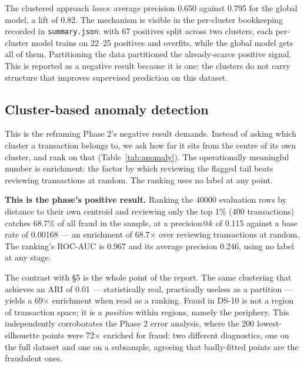 \documentclass[11pt, a4paper]{article}
\providecommand{\num}[1]{#1}
\begin{document}


The clustered approach \emph{loses}: average precision \num{0.650} against
\num{0.795} for the global model, a lift of \num{0.82}. The mechanism is visible
in the per-cluster bookkeeping recorded in \texttt{summary.json}: with \num{67}
positives split across two clusters, each per-cluster model trains on 22--25
positives and overfits, while the global model gets all of them. Partitioning the
data partitioned the already-scarce positive signal. This is reported as a
negative result because it is one; the clusters do not carry structure that
improves supervised prediction on this dataset.

\subsection{Cluster-based anomaly detection}
This is the reframing Phase 2's negative result demands. Instead of asking which
cluster a transaction belongs to, we ask how far it sits from the centre of its
own cluster, and rank on that (Table~\ref{tab:anomaly}). The operationally
meaningful number is enrichment: the factor by which reviewing the flagged tail
beats reviewing transactions at random. The ranking uses no label at any point.



\textbf{This is the phase's positive result.} Ranking the \num{40000} evaluation
rows by distance to their own centroid and reviewing only the top 1\% (\num{400}
transactions) catches \num{68.7}\% of all fraud in the sample, at a
precision@$k$ of \num{0.115} against a base rate of \num{0.00168} --- an
enrichment of \num{68.7}$\times$ over reviewing transactions at random. The
ranking's ROC-AUC is \num{0.967} and its average precision \num{0.246}, using no
label at any stage.

The contrast with §5 is the whole point of the report. The same clustering that
achieves an ARI of \num{0.01} --- statistically real, practically useless as a
partition --- yields a \num{69}$\times$ enrichment when read as a ranking. Fraud
in DS-10 is not a region of transaction space; it is a \emph{position} within
regions, namely the periphery. This independently corroborates the Phase 2 error
analysis, where the \num{200} lowest-silhouette points were \num{72}$\times$
enriched for fraud: two different diagnostics, one on the full dataset and one on
a subsample, agreeing that badly-fitted points are the fraudulent ones.
\end{document}
